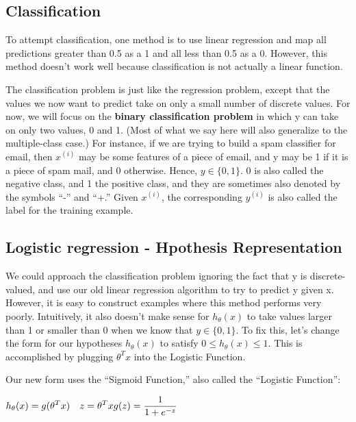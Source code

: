 \documentclass[
]{article}
\begin{document}
\hypertarget{classification}{%
\subsection{Classification}\label{classification}}

To attempt classification, one method is to use linear regression and
map all predictions greater than 0.5 as a 1 and all less than 0.5 as a
0. However, this method doesn't work well because classification is not
actually a linear function.

The classification problem is just like the regression problem, except
that the values we now want to predict take on only a small number of
discrete values. For now, we will focus on the \textbf{binary
classification problem} in which y can take on only two values, 0 and 1.
(Most of what we say here will also generalize to the multiple-class
case.) For instance, if we are trying to build a spam classifier for
email, then \(x^{(i)}\) may be some features of a piece of email, and y
may be 1 if it is a piece of spam mail, and 0 otherwise. Hence,
\(y∈{\{0,1\}}\). 0 is also called the negative class, and 1 the positive
class, and they are sometimes also denoted by the symbols ``-'' and
``+.'' Given \(x^{(i)}\), the corresponding \(y^{(i)}\) is also called
the label for the training example.

\hypertarget{logistic-regression---hpothesis-representation}{%
\subsection{Logistic regression - Hpothesis
Representation}\label{logistic-regression---hpothesis-representation}}

We could approach the classification problem ignoring the fact that y is
discrete-valued, and use our old linear regression algorithm to try to
predict y given x. However, it is easy to construct examples where this
method performs very poorly. Intuitively, it also doesn't make sense for
\(h_\theta (x)\) to take values larger than 1 or smaller than 0 when we
know that \(y ∈ {\{0, 1\}}\). To fix this, let's change the form for our
hypotheses \(h_\theta (x)\) to satisfy \(0 \leq h_\theta (x) \leq 1\).
This is accomplished by plugging \(\theta^Tx\) into the Logistic
Function.

Our new form uses the ``Sigmoid Function,'' also called the ``Logistic
Function'':

\(\begin{align*}& h_\theta (x) = g ( \theta^T x ) \newline \newline& z = \theta^T x \newline& g(z) = \dfrac{1}{1 + e^{-z}}\end{align*}\)
\end{document}
